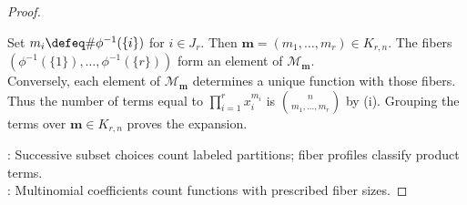 \begin{proposition}
\begin{proof}
\begin{enumerate}[label=(\roman*)]
Set $m_i\defeq\#\phi^{-1}(\{i\})$ for $i\in J_r$. Then $\mathbf{m}=(m_1,\ldots,m_r)\in K_{r,n}$. The fibers $(\phi^{-1}(\{1\}),\ldots,\phi^{-1}(\{r\}))$ form an element of $\mathcal{M}_{\mathbf{m}}$.\\
Conversely, each element of $\mathcal{M}_{\mathbf{m}}$ determines a unique function with those fibers.\\
Thus the number of terms equal to $\prod\limits_{i=1}^{r}x_i^{m_i}$ is $\binom{n}{m_1,\ldots,m_r}$ by (i). Grouping the terms over $\mathbf{m}\in K_{r,n}$ proves the expansion.
\end{enumerate}
: Successive subset choices count labeled partitions; fiber profiles classify product terms.\\
: Multinomial coefficients count functions with prescribed fiber sizes.
\end{proof}
\end{proposition}

